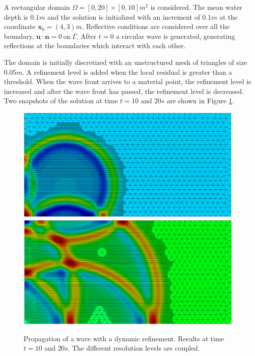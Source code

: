 A rectangular domain $\Omega=[0,20]\times[0,10]m^2$ is considered. The mean water depth is $0.1m$ and the solution is initialized with an increment of $0.1m$ at the coordinate $\mathbf{x}_0=(4,3)m$. Reflective conditions are considered over all the boundary, $\mathbf{u} \cdot \mathbf{n} = 0\ \text{on}\ \Gamma$.
After $t=0$ a circular wave is generated, generating reflections at the boundaries which interact with each other.

The domain is initially discretized with an unstructured mesh of triangles of size $0.05m$. A refinement level is added when the local residual is greater than a threshold. When the wave front arrives to a material point, the refinement level is increased and after the wave front has passed, the refinement level is decreased.
Two snapshots of the solution at time $t=10$ and $20s$ are shown in Figure \ref{multilevel_dynamic}.


\begin{figure} [htb]
    \centering
    \includegraphics[width=\textwidth]{img/multigrid/dynamic/dynamic-10}\\
    \vspace{5pt}
    \includegraphics[width=\textwidth]{img/multigrid/dynamic/dynamic-20}
    \caption{Propagation of a wave with a dynamic refinement. Results at time $t=10$ and $20s$. The different resolution levels are coupled.}
    \label{multilevel_dynamic}
\end{figure}


